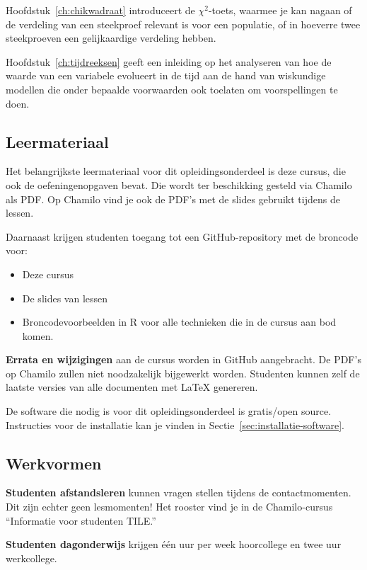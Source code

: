 Hoofdstuk~\ref{ch:chikwadraat} introduceert de $\chi^2$-toets, waarmee je kan nagaan of de verdeling van een steekproef relevant is voor een populatie, of in hoeverre twee steekproeven een gelijkaardige verdeling hebben.

Hoofdstuk~\ref{ch:tijdreeksen} geeft een inleiding op het analyseren van hoe de waarde van een variabele evolueert in de tijd aan de hand van wiskundige modellen die onder bepaalde voorwaarden ook toelaten om voorspellingen te doen.

\subsection{Leermateriaal}

Het belangrijkste leermateriaal voor dit opleidingsonderdeel is deze cursus, die ook de oefeningenopgaven bevat. Die wordt ter beschikking gesteld via Chamilo als PDF. Op Chamilo vind je ook de PDF's met de slides gebruikt tijdens de lessen.

Daarnaast krijgen studenten toegang tot een GitHub-repository met de broncode voor:

\begin{itemize}
  \item Deze cursus
  \item De slides van lessen
  \item Broncodevoorbeelden in R voor alle technieken die in de cursus aan bod komen.
\end{itemize}

\textbf{Errata en wijzigingen} aan de cursus worden in GitHub aangebracht. De PDF's op Chamilo zullen niet noodzakelijk bijgewerkt worden. Studenten kunnen zelf de laatste versies van alle documenten met \LaTeX{} genereren.

De software die nodig is voor dit opleidingsonderdeel is gratis/open source. Instructies voor de installatie kan je vinden in Sectie~\ref{sec:installatie-software}.

\subsection{Werkvormen}

\textbf{Studenten afstandsleren} kunnen vragen stellen tijdens de contactmomenten. Dit zijn echter geen lesmomenten! Het rooster vind je in de Chamilo-cursus ``Informatie voor studenten TILE.''

\textbf{Studenten dagonderwijs} krijgen één uur per week hoorcollege en twee uur werkcollege.

